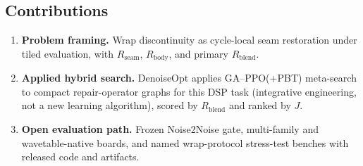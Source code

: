 \subsection{Contributions}
\label{sec:contributions}
\begin{enumerate}
  \item \textbf{Problem framing.} Wrap discontinuity as cycle-local seam restoration under tiled evaluation, with $R_{\mathrm{seam}}$, $R_{\mathrm{body}}$, and primary $R_{\mathrm{blend}}$.
  \item \textbf{Applied hybrid search.} DenoiseOpt applies GA--PPO(+PBT) meta-search to compact repair-operator graphs for this DSP task (integrative engineering, not a new learning algorithm), scored by $R_{\mathrm{blend}}$ and ranked by $J$.
  \item \textbf{Open evaluation path.} Frozen Noise2Noise gate, multi-family and wavetable-native boards, and named wrap-protocol stress-test benches with released code and artifacts.
\end{enumerate}
